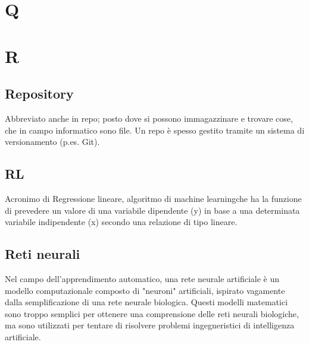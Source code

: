 
\clearpage
\section*{Q}

\clearpage
\section*{R}

\subsection*{Repository}
Abbreviato anche in repo; posto dove si possono immagazzinare e trovare cose, che in campo informatico sono file. Un repo è spesso gestito tramite un sistema di versionamento (p.es. Git).


\subsection*{RL}
Acronimo di Regressione lineare, algoritmo di machine learning\glosp che ha la funzione di prevedere un valore di una variabile dipendente (y) in base a una determinata variabile indipendente (x) secondo una relazione di tipo lineare.

\subsection*{Reti neurali}
Nel campo dell'apprendimento automatico, una rete neurale artificiale  è un modello computazionale composto di "neuroni" artificiali, ispirato vagamente dalla semplificazione di una rete neurale biologica. Questi modelli matematici sono troppo semplici per ottenere una comprensione delle reti neurali biologiche, ma sono utilizzati per tentare di risolvere problemi ingegneristici di intelligenza artificiale.

